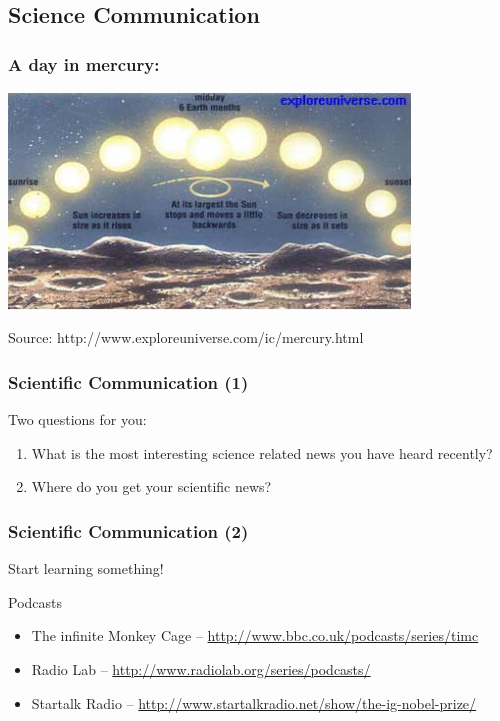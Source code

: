 \documentclass{beamer}
\begin{document}
\subsection{Science Communication}
\begin{frame}
  \frametitle{A day in mercury:}
  \begin{center}
    \includegraphics[width=0.8\textwidth]{img/mercuryday}
  \end{center}

  \vfill 

  {\tiny
  Source: http://www.exploreuniverse.com/ic/mercury.html }
\end{frame}

\begin{frame}
  \frametitle{Scientific Communication (1)}

  Two questions for you:

  \begin{enumerate}
  \item<1-> What is the most interesting science related news you have heard recently?
  \item<2-> Where do you get your scientific news?
  \end{enumerate}

\end{frame}

\begin{frame}
  \frametitle{Scientific Communication (2)}

  Start learning something!

  \begin{block}{Podcasts}
    \begin{itemize}
    \item The infinite Monkey Cage -- \url{http://www.bbc.co.uk/podcasts/series/timc} 
    \item Radio Lab -- \url{http://www.radiolab.org/series/podcasts/}
    \item Startalk Radio -- \url{http://www.startalkradio.net/show/the-ig-nobel-prize/}
    \end{itemize}
  \end{block}
\end{frame}
\end{document}

